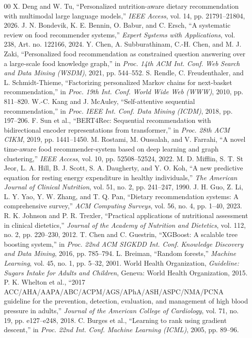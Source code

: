 \documentclass[10pt, conference, letterpaper]{IEEEtran}
\begin{document}
\begin{thebibliography}{00}
 X. Deng and W. Tu, ``Personalized nutrition-aware dietary recommendation with multimodal large language models,'' \textit{IEEE Access}, vol. 14, pp. 21791--21804, 2026.
 J. N. Bondevik, K. E. Bennin, O. Babur, and C. Ersch, ``A systematic review on food recommender systems,'' \textit{Expert Systems with Applications}, vol. 238, Art. no. 122166, 2024.
 Y. Chen, A. Subburathinam, C.-H. Chen, and M. J. Zaki, ``Personalized food recommendation as constrained question answering over a large-scale food knowledge graph,'' in \textit{Proc. 14th ACM Int. Conf. Web Search and Data Mining (WSDM)}, 2021, pp. 544--552.
 S. Rendle, C. Freudenthaler, and L. Schmidt-Thieme, ``Factorizing personalized Markov chains for next-basket recommendation,'' in \textit{Proc. 19th Int. Conf. World Wide Web (WWW)}, 2010, pp. 811--820.
 W.-C. Kang and J. McAuley, ``Self-attentive sequential recommendation,'' in \textit{Proc. IEEE Int. Conf. Data Mining (ICDM)}, 2018, pp. 197--206.
 F. Sun et al., ``BERT4Rec: Sequential recommendation with bidirectional encoder representations from transformer,'' in \textit{Proc. 28th ACM CIKM}, 2019, pp. 1441--1450.
 M. Rostami, M. Oussalah, and V. Farrahi, ``A novel time-aware food recommender-system based on deep learning and graph clustering,'' \textit{IEEE Access}, vol. 10, pp. 52508--52524, 2022.
 M. D. Mifflin, S. T. St Jeor, L. A. Hill, B. J. Scott, S. A. Daugherty, and Y. O. Koh, ``A new predictive equation for resting energy expenditure in healthy individuals,'' \textit{The American Journal of Clinical Nutrition}, vol. 51, no. 2, pp. 241--247, 1990.
 J. H. Guo, Z. Li, L. Y. Yao, Y. W. Zhang, and T. Q. Pan, ``Dietary recommendation systems: A comprehensive survey,'' \textit{ACM Computing Surveys}, vol. 56, no. 4, pp. 1--40, 2023.
 R. K. Johnson and P. R. Trexler, ``Practical applications of nutritional assessment in clinical dietetics,'' \textit{Journal of the Academy of Nutrition and Dietetics}, vol. 112, no. 2, pp. 220--230, 2012.
 T. Chen and C. Guestrin, ``XGBoost: A scalable tree boosting system,'' in \textit{Proc. 22nd ACM SIGKDD Int. Conf. Knowledge Discovery and Data Mining}, 2016, pp. 785--794.
 L. Breiman, ``Random forests,'' \textit{Machine Learning}, vol. 45, no. 1, pp. 5--32, 2001.
 World Health Organization, \textit{Guideline: Sugars Intake for Adults and Children}, Geneva: World Health Organization, 2015.
 P. K. Whelton et al., ``2017 ACC/AHA/AAPA/ABC/ACPM/AGS/APhA/ASH/ASPC/NMA/PCNA guideline for the prevention, detection, evaluation, and management of high blood pressure in adults,'' \textit{Journal of the American College of Cardiology}, vol. 71, no. 19, pp. e127--e248, 2018.
 C. Burges et al., ``Learning to rank using gradient descent,'' in \textit{Proc. 22nd Int. Conf. Machine Learning (ICML)}, 2005, pp. 89--96.
\end{thebibliography}
\end{document}
